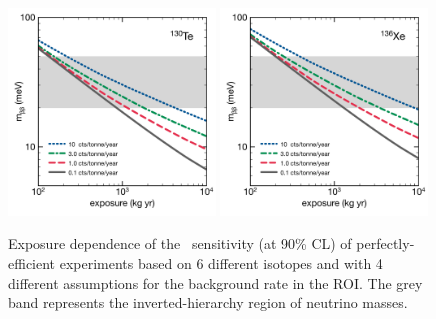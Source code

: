 \documentclass{PoS}
\begin{document}
\begin{figure}
\includegraphics[width=0.49\textwidth]{img/FutureTe130.pdf}
\includegraphics[width=0.49\textwidth]{img/FutureXe136.pdf}
\caption{Exposure dependence of the \mbb\ sensitivity (at 90\% CL) of perfectly-efficient experiments based on 6 different isotopes and with 4 different assumptions for the background rate in the ROI. The grey band represents the inverted-hierarchy region of neutrino masses.} \label{fig:FutureGen}
\end{figure}

\end{document}
